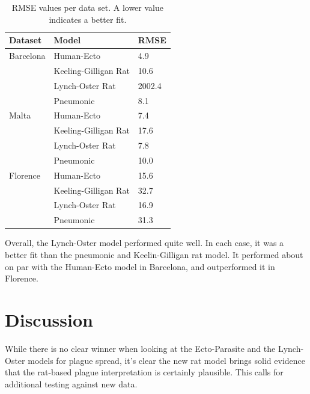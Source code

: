 \documentclass [letterpaper, 12pt] {article}
\begin{document}
\begin{table}[H]
\begin{center}
\begin{tabular}{|l|l|l|}
\hline
\textbf{Dataset} & \textbf{Model}       & \textbf{RMSE} \\ \hline
Barcelona        & Human-Ecto           & 4.9      \\ \cline{2-3} 
                 & Keeling-Gilligan Rat & 10.6      \\ \cline{2-3} 
                 & Lynch-Oster Rat      & 2002.4       \\ \cline{2-3} 
                 & Pneumonic            & 8.1       \\ \hline
Malta            & Human-Ecto           & 7.4         \\ \cline{2-3} 
                 & Keeling-Gilligan Rat & 17.6       \\ \cline{2-3} 
                 & Lynch-Oster Rat      & 7.8      \\ \cline{2-3} 
                 & Pneumonic            & 10.0      \\ \hline
Florence         & Human-Ecto           & 15.6       \\ \cline{2-3} 
                 & Keeling-Gilligan Rat & 32.7     \\ \cline{2-3} 
                 & Lynch-Oster Rat      & 16.9      \\ \cline{2-3} 
                 & Pneumonic            & 31.3      \\ \hline
\end{tabular}
\end{center}
\caption{RMSE values per data set. A lower value indicates a better fit.}
\end{table}



Overall, the Lynch-Oster model performed quite well. In each case, it was a better fit than the pneumonic and Keelin-Gilligan rat model. It performed about on par with the Human-Ecto model in Barcelona, and outperformed it in Florence.

\newpage

\section {Discussion}

While there is no clear winner when looking at the Ecto-Parasite and the Lynch-Oster models for plague spread, it's clear the new rat model brings solid evidence that the rat-based plague interpretation is certainly plausible. This calls for additional testing against new data.
\end{document}
